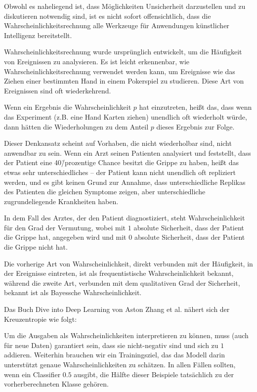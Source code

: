 Obwohl es naheliegend ist, dass Möglichkeiten Unsicherheit darzustellen und zu diskutieren notwendig sind, ist es nicht sofort offensichtlich, dass die Wahrscheinlichkeitsrechnung alle Werkzeuge für Anwendungen künstlicher Intelligenz bereitstellt.

Wahrscheinlichkeitsrechnung wurde ursprünglich entwickelt, um die Häufigkeit von Ereignissen zu analysieren. Es ist leicht erkennenbar, wie Wahrscheinlichkeitsrechnung verwendet werden kann, um Ereignisse wie das Ziehen einer bestimmten Hand in einem Pokerspiel zu studieren. Diese Art von Ereignissen sind oft wiederkehrend.

Wenn ein Ergebnis die Wahrscheinlichkeit $p$ hat einzutreten, heißt das, dass wenn das Experiment (z.B. eine Hand Karten ziehen) unendlich oft wiederholt würde, dann hätten die Wiederholungen zu dem Anteil $p$ dieses Ergebnis zur Folge.

Dieser Denkansatz scheint auf Vorhaben, die nicht wiederholbar sind, nicht anwendbar zu sein. Wenn ein Arzt seinen Patienten analysiert und feststellt, dass der Patient eine 40\=/prozentige Chance besitzt die Grippe zu haben, heißt das etwas sehr unterschiedliches -- der Patient kann nicht unendlich oft repliziert werden, und es gibt keinen Grund zur Annahme, dass unterschiedliche Replikas des Patienten die gleichen Symptome zeigen, aber unterschiedliche zugrundeliegende Krankheiten haben.

In dem Fall des Arztes, der den Patient diagnostiziert, steht Wahrscheinlichkeit für den Grad der Vermutung, wobei mit $1$ absolute Sicherheit, dass der Patient die Grippe hat, angegeben wird und mit $0$ absolute Sicherheit, dass der Patient die Grippe nicht hat.

Die vorherige Art von Wahrscheinlichkeit, direkt verbunden mit der Häufigkeit, in der Ereignisse eintreten, ist als frequentistische Wahrscheinlichkeit bekannt, während die zweite Art, verbunden mit dem qualitativen Grad der Sicherheit, bekannt ist als Bayessche Wahrscheinlichkeit.
\cite{goodfellow2016deeplearning}

Das Buch Dive into Deep Learning von Aston Zhang et al. \cite{zhang2020dive} nähert sich der Kreuzentropie wie folgt:

Um die Ausgaben als Wahrscheinlichkeiten interpretieren zu können, muss (auch für neue Daten) garantiert sein, dass sie nicht-negativ sind und sich zu $1$ addieren. Weiterhin brauchen wir ein Trainingsziel, das das Modell darin unterstützt genaue Wahrscheinlichkeiten zu schätzen. In allen Fällen sollten, wenn ein Classifier $0.5$ ausgibt, die Hälfte dieser Beispiele tatsächlich zu der vorherberechneten Klasse gehören.


